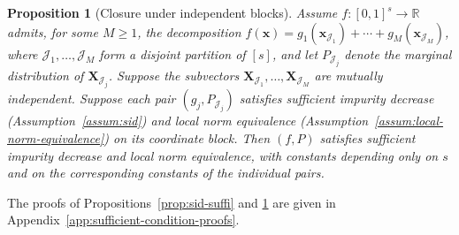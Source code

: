 \documentclass[11pt]{article}
\theoremstyle{plain}
\newtheorem{proposition}[theorem]{Proposition}
\theoremstyle{definition}
\theoremstyle{remark}
\theoremstyle{plain}
\newcommand{\bx}{\mathbf{x}}
\newcommand{\bX}{\mathbf{X}}
\newcommand{\1}{\mathbbm{1}}
\begin{document}
\begin{proposition}[Closure under independent blocks]\label{prop:additive}
    Assume $f\colon[0,1]^s\to\mathbb{R}$ admits, for some $M\ge1$, the decomposition
    $f(\bx) = g_1(\bx_{\mathcal{J}_1}) + \cdots
              + g_M(\bx_{\mathcal{J}_M})$,
    where $\mathcal{J}_1,\ldots,\mathcal{J}_M$ form a disjoint
    partition of $[s]$, and let $P_{\mathcal{J}_j}$ denote
    the marginal distribution of $\bX_{\mathcal{J}_j}$.
    Suppose
    the subvectors
    $\bX_{\mathcal{J}_1},\ldots,\bX_{\mathcal{J}_M}$ are
    mutually independent.
    Suppose each pair $(g_j,P_{\mathcal{J}_j})$ satisfies sufficient impurity decrease (Assumption~\ref{assum:sid}) and local norm equivalence (Assumption~\ref{assum:local-norm-equivalence}) on its coordinate block.
    Then $(f,P)$ satisfies sufficient impurity decrease and local norm equivalence, with constants depending only on $s$ and on the corresponding constants of the individual pairs.
\end{proposition}

The proofs of Propositions~\ref{prop:sid-suffi} and \ref{prop:additive} are given in Appendix~\ref{app:sufficient-condition-proofs}.



\end{document}
